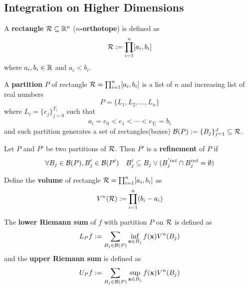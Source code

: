 \documentclass[11pt]{article}
\begin{document}
		\subsection{Integration on Higher Dimensions}
			\begin{definition}
				A \textbf{rectangle} $\mathcal{{R}} \subseteq \mathbb{R}^n$ (\textbf{$n$-orthotope}) is defined as
				\begin{equation}
					\mathcal{{R}} := \prod_{i=1}^n [a_i, b_i]
				\end{equation}
				where $a_i, b_i \in \mathbb{R}$ and $a_i < b_i$.
			\end{definition}
			
			\begin{definition}
				A \textbf{partition} $P$ of rectangle $\mathcal{{R}} = \prod_{i=1}^n [a_i, b_i]$ is a list of $n$  and increasing list of real numbers
				\begin{equation}
					P = \{L_1, L_2, \dots, L_n\}
				\end{equation}
				where $L_i = \{e_j\}_{j=0}^{T_i}$ such that
				\begin{equation}
					a_i = e_0 < e_1 < \cdots < e_{T_i} = b_i
				\end{equation}
				and such partition generates a set of rectangles(boxes) $\mathcal{{B}}(P) := \{B_j\}_{j=1}^J \subseteq \mathcal{{R}}$.
			\end{definition}
			
			\begin{definition}
				Let $P$ and $P'$ be two partitions of $\mathcal{{R}}$. Then $P'$ is a \textbf{refinement} of $P$ if 
				\begin{equation}
					\forall B_j \in \mathcal{{B}}(P), B_j' \in \mathcal{{B}}(P')\quad B_j' \subseteq B_j \lor (B_j^{' int} \cap B_j^{int} = \emptyset)
				\end{equation}
			\end{definition}
			
			\begin{definition}
				Define the \textbf{volume} of rectangle $\mathcal{{R}} = \prod_{i=1}^n [a_i, b_i]$ as
				\begin{equation}
					V^n(\mathcal{{R}}) := \prod_{i=1}^n (b_i - a_i)
				\end{equation}
			\end{definition}
			
			\begin{definition}
				The \textbf{lower Riemann sum} of $f$ with partition $P$ on $\mathcal{{R}}$ is defined as
				\begin{equation}
					L_P f := \sum_{B_j \in \mathcal{{B}}(P)} \inf_{\textbf{x} \in B_j} f(\textbf{x}) V^n(B_j)
				\end{equation}
				and the \textbf{upper Riemann sum} is defined as
				\begin{equation}
					U_P f := \sum_{B_j \in \mathcal{{B}}(P)} \sup_{\textbf{x} \in B_j} f(\textbf{x}) V^n(B_j)
				\end{equation}
			\end{definition}
			
\end{document}
